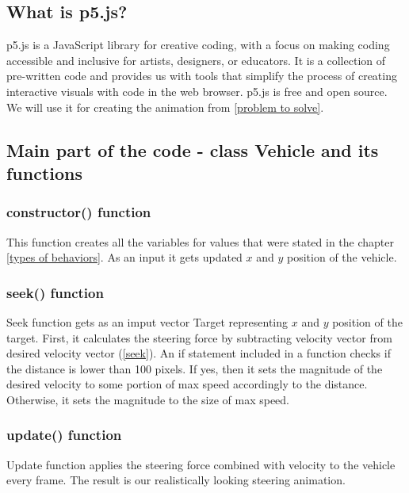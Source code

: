 \documentclass[10pt,twoside,english,a4paper]{article}
\begin{document}
\subsection{What is p5.js?} \label{p5 char} 

p5.js is a JavaScript library for creative coding, with a focus on 
making coding accessible and inclusive for artists, designers, or 
educators. It is a collection of pre-written code and provides us 
with tools that simplify the process of creating interactive visuals 
with code in the web browser. p5.js is free and open source. We 
will use it for creating the animation from \ref{problem to solve}. 

\subsection{Main part of the code - class Vehicle and its functions} \label{class Vehicle} 

\subsubsection{constructor() function} \label{constructorf} 

This function creates all the variables for values that were stated in the 
chapter \ref{types of behaviors}. As an input it gets updated $x$ and $y$ position
of the vehicle. 


\subsubsection{seek() function} \label{seekf} 

Seek function gets as an imput vector Target representing $x$ and $y$ position
of the target. First, it calculates the steering force by subtracting velocity vector
from desired velocity vector (\ref{seek}). An if statement included in a function checks if 
the distance is lower than 100 pixels. If yes, then it sets the magnitude of the 
desired velocity to some portion of max speed accordingly to the distance. 
Otherwise, it sets the magnitude to the size of max speed.

\subsubsection{update() function} \label{updatef} 

Update function applies the steering force combined with velocity to the vehicle
every frame. The result is our realistically looking steering animation. 
\end{document}
